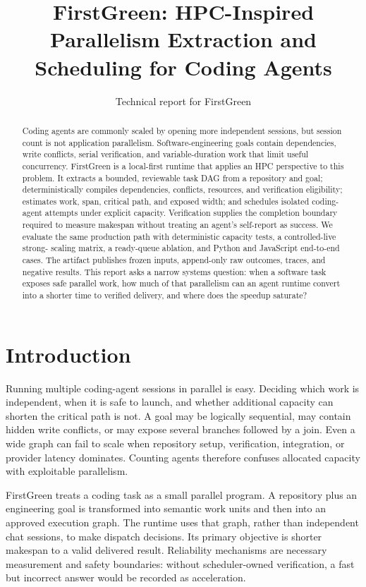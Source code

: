 \documentclass[10pt,twocolumn]{article}
\title{FirstGreen: HPC-Inspired Parallelism Extraction and Scheduling for Coding Agents}
\author{\FGAuthor}
\date{Technical report for FirstGreen \FGReleaseVersion}
\begin{document}
\maketitle

\begin{abstract}
Coding agents are commonly scaled by opening more independent sessions, but session count is not
application parallelism. Software-engineering goals contain dependencies, write conflicts, serial
verification, and variable-duration work that limit useful concurrency. FirstGreen is a local-first
runtime that applies an HPC perspective to this problem. It extracts a bounded, reviewable task DAG
from a repository and goal; deterministically compiles dependencies, conflicts, resources, and
verification eligibility; estimates work, span, critical path, and exposed width; and schedules
isolated coding-agent attempts under explicit capacity. Verification supplies the completion
boundary required to measure makespan without treating an agent's self-report as success. We
evaluate the same production path with deterministic capacity tests, a controlled-live strong-
scaling matrix, a ready-queue ablation, and Python and JavaScript end-to-end cases. The artifact
publishes frozen inputs, append-only raw outcomes, traces, and negative results. This report asks a
narrow systems question: when a software task exposes safe parallel work, how much of that
parallelism can an agent runtime convert into a shorter time to verified delivery, and where does
the speedup saturate?
\end{abstract}

\section{Introduction}

Running multiple coding-agent sessions in parallel is easy. Deciding which work is independent,
when it is safe to launch, and whether additional capacity can shorten the critical path is not.
A goal may be logically sequential, may contain hidden write conflicts, or may expose several
branches followed by a join. Even a wide graph can fail to scale when repository setup,
verification, integration, or provider latency dominates. Counting agents therefore confuses
allocated capacity with exploitable parallelism.

FirstGreen treats a coding task as a small parallel program. A repository plus an engineering goal
is transformed into semantic work units and then into an approved execution graph. The runtime
uses that graph, rather than independent chat sessions, to make dispatch decisions. Its primary
objective is shorter makespan to a valid delivered result. Reliability mechanisms are necessary
measurement and safety boundaries: without scheduler-owned verification, a fast but incorrect
answer would be recorded as acceleration.
\end{document}
